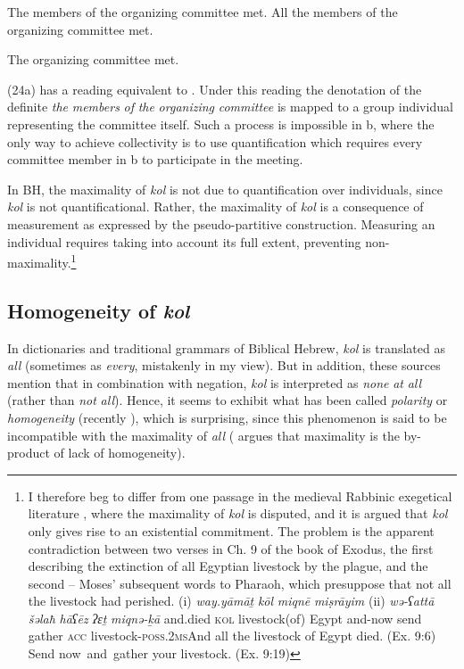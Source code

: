 \documentclass[output=paper]{langsci/langscibook}
\begin{document}
\ea%
    \label{ex:doron:24}
    \ea The members of the organizing committee met.
    \ex All the members of the organizing committee met.
    \z
\z


\ea%
    \label{ex:doron:25}
    The organizing committee met.
\z

(24a) has a reading equivalent to . Under this reading the denotation of the definite \textit{the} \textit{members} \textit{of} \textit{the} \textit{organizing} \textit{committee} is mapped to a group individual representing the committee itself. Such a process is impossible in b, where the only way to achieve collectivity is to use quantification which requires every committee member in b to participate in the meeting.

In BH, the maximality of \textit{kol} is not due to quantification over individuals, since \textit{kol} is not quantificational. Rather, the maximality of \textit{kol} is a consequence of measurement as expressed by the pseudo-partitive construction. Measuring an individual requires taking into account its full extent, preventing non-maximality.\footnote{I therefore beg to differ from one passage in the medieval Rabbinic exegetical literature \citep[245]{Assaf1929}, where the maximality of \textit{kol} is disputed, and it is argued that \textit{kol} only gives rise to an existential commitment. The problem is the apparent contradiction between two verses in Ch. 9 of the book of Exodus, the first describing the extinction of all Egyptian livestock by the plague, and the second – Moses’ subsequent words to Pharaoh, which presuppose that not all the livestock had perished.  (i)  \textit{way.yāmāṯ}  \textit{kōl}   \textit{miqnē}            \textit{miṣrāyim}      (ii)  \textit{wə-ʕattā}  \textit{šəlaħ}  \textit{hāʕēz} \textit{ʔɛṯ}    \textit{miqnə-ḵā}  and.died      \textsc{kol} livestock(of) Egypt    and-now  send  gather \textsc{acc} livestock-\textsc{poss.2ms}\textrm{And all the livestock of Egypt died.   (}Ex. 9:6) \textrm{Send now~and~gather your livestock.} (Ex. 9:19)}

\subsection{Homogeneity of \textit{kol}}\label{sec:doron:3.3}%

In dictionaries and traditional grammars of Biblical Hebrew, \textit{kol} is translated as \textit{all} (sometimes as \textit{every}, mistakenly in my view). But in addition, these sources mention that in combination with negation, \textit{kol} is interpreted as \textit{none} \textit{at} \textit{all} (rather than \textit{not} \textit{all}). Hence, it seems to exhibit what has been called \textit{polarity} \citep{Löbner2000} or \textit{homogeneity} (recently \citealt{Križ2016}), which is surprising, since this phenomenon is said to be incompatible with the maximality of \textit{all} (\citealt{Križ2016} argues that maximality is the by-product of lack of homogeneity).
\end{document}
